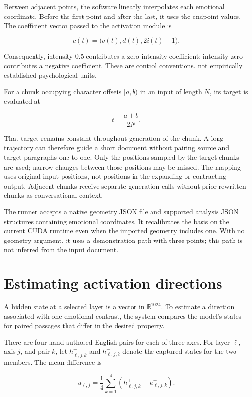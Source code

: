\documentclass[manuscript,screen,nonacm]{acmart}
\begin{document}
Between adjacent points, the software linearly interpolates each
emotional coordinate. Before the first point and after the last, it uses
the endpoint values. The coefficient vector passed to the activation
module is

\[
c(t)=\bigl(v(t),d(t),2i(t)-1\bigr).
\]

Consequently, intensity 0.5 contributes a zero intensity coefficient;
intensity zero contributes a negative coefficient. These are control
conventions, not empirically established psychological units.

For a chunk occupying character offsets \([a,b)\) in an input of length
\(N\), its target is evaluated at

\[
t=\frac{a+b}{2N}.
\]

That target remains constant throughout generation of the chunk. A long
trajectory can therefore guide a short document without pairing source
and target paragraphs one to one. Only the positions sampled by the
target chunks are used; narrow changes between those positions may be
missed. The mapping uses original input positions, not positions in the
expanding or contracting output. Adjacent chunks receive separate
generation calls without prior rewritten chunks as conversational
context.

The runner accepts a native geometry JSON file and supported analysis
JSON structures containing emotional coordinates. It recalibrates the
basis on the current CUDA runtime even when the imported geometry
includes one. With no geometry argument, it uses a demonstration path
with three points; this path is not inferred from the input document.



\section{Estimating activation
directions}\label{estimating-activation-directions}

A hidden state at a selected layer is a vector in \(\mathbb{R}^{1024}\).
To estimate a direction associated with one emotional contrast, the
system compares the model's states for paired passages that differ in
the desired property.

There are four hand-authored English pairs for each of three axes. For
layer \(\ell\), axis \(j\), and pair \(k\), let \(h^+_{\ell,j,k}\) and
\(h^-_{\ell,j,k}\) denote the captured states for the two members. The
mean difference is

\[
u_{\ell,j}=\frac14\sum_{k=1}^{4}
\left(h^+_{\ell,j,k}-h^-_{\ell,j,k}\right).
\]
\end{document}
